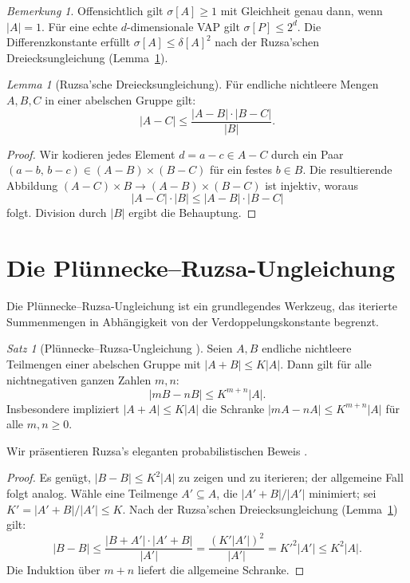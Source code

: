 \documentclass[12pt,a4paper]{amsart}
\theoremstyle{definition}
\theoremstyle{remark}
\newtheorem{satz}[theorem]{Satz}
\newtheorem{lemma_de}[theorem]{Lemma}
\newtheorem{bemerkung}[theorem]{Bemerkung}
\begin{document}
\begin{bemerkung}
Offensichtlich gilt $\sigma[A] \geq 1$ mit Gleichheit genau dann, wenn $|A| = 1$.
Für eine echte $d$-dimensionale VAP gilt $\sigma[P] \leq 2^d$. Die
Differenzkonstante erfüllt $\sigma[A] \leq \delta[A]^2$ nach der Ruzsa'schen
Dreiecksungleichung (Lemma~\ref{lem:ruzsa_dr}).
\end{bemerkung}

\begin{lemma_de}[Ruzsa'sche Dreiecksungleichung]\label{lem:ruzsa_dr}
Für endliche nichtleere Mengen $A, B, C$ in einer abelschen Gruppe gilt:
\[
  |A - C| \leq \frac{|A - B| \cdot |B - C|}{|B|}.
\]
\end{lemma_de}

\begin{proof}
Wir kodieren jedes Element $d = a - c \in A - C$ durch ein Paar
$(a - b,\, b - c) \in (A - B) \times (B - C)$ für ein festes $b \in B$.
Die resultierende Abbildung $(A - C) \times B \to (A - B) \times (B - C)$
ist injektiv, woraus
\[
  |A - C| \cdot |B| \leq |A - B| \cdot |B - C|
\]
folgt. Division durch $|B|$ ergibt die Behauptung.
\end{proof}

\section{Die Plünnecke--Ruzsa-Ungleichung}\label{sec:plunnecke}

Die Plünnecke--Ruzsa-Ungleichung ist ein grundlegendes Werkzeug, das iterierte
Summenmengen in Abhängigkeit von der Verdoppelungskonstante begrenzt.

\begin{satz}[Plünnecke--Ruzsa-Ungleichung \cite{Plunnecke1970,Ruzsa1989}]\label{satz:plunnecke}
Seien $A, B$ endliche nichtleere Teilmengen einer abelschen Gruppe mit
$|A + B| \leq K|A|$. Dann gilt für alle nichtnegativen ganzen Zahlen $m, n$:
\[
  |mB - nB| \leq K^{m+n} |A|.
\]
Insbesondere impliziert $|A + A| \leq K|A|$ die Schranke
$|mA - nA| \leq K^{m+n}|A|$ für alle $m, n \geq 0$.
\end{satz}

Wir präsentieren Ruzsa's eleganten probabilistischen Beweis \cite{Ruzsa2009}.

\begin{proof}
Es genügt, $|B - B| \leq K^2 |A|$ zu zeigen und zu iterieren; der allgemeine
Fall folgt analog. Wähle eine Teilmenge $A' \subseteq A$, die $|A' + B|/|A'|$
minimiert; sei $K' = |A' + B|/|A'| \leq K$. Nach der Ruzsa'schen
Dreiecksungleichung (Lemma~\ref{lem:ruzsa_dr}) gilt:
\[
  |B - B| \leq \frac{|B + A'| \cdot |A' + B|}{|A'|}
  = \frac{(K'|A'|)^2}{|A'|}
  = K'^2 |A'| \leq K^2 |A|.
\]
Die Induktion über $m + n$ liefert die allgemeine Schranke.
\end{proof}
\end{document}
